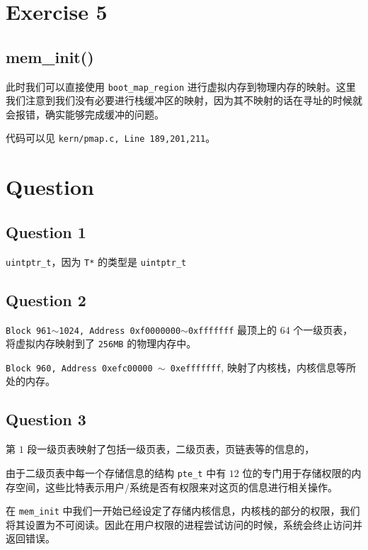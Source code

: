 \documentclass[11pt]{article}
\begin{document}
	
	\section{Exercise 5}
	
	\subsection*{mem\_init()}
		\par 此时我们可以直接使用 \texttt{boot\_map\_region} 进行虚拟内存到物理内存的映射。这里我们注意到我们没有必要进行栈缓冲区的映射，因为其不映射的话在寻址的时候就会报错，确实能够完成缓冲的问题。
	
		\par 代码可以见 \texttt{kern/pmap.c, Line 189,201,211}。
		
	\section{Question}
	
	\subsection*{Question 1}
		\par \texttt{uintptr\_t}，因为 \texttt{T*} 的类型是 \texttt{uintptr\_t}
		
	\subsection*{Question 2}
	\par 
	\texttt{Block 961$\sim$1024, Address 0xf0000000$\sim$0xfffffff} 最顶上的 $64$ 个一级页表，将虚拟内存映射到了 \texttt{256MB} 的物理内存中。
	\par 
	\texttt{Block 960, Address 0xefc00000 $\sim$ 0xefffffff}, 映射了内核栈，内核信息等所处的内存。
		
	\subsection*{Question 3}
	\par 第 $1$ 段一级页表映射了包括一级页表，二级页表，页链表等的信息的，
	
	\par 由于二级页表中每一个存储信息的结构 \texttt{pte\_t} 中有 $12$ 位的专门用于存储权限的内存空间，这些比特表示用户/系统是否有权限来对这页的信息进行相关操作。
	
	\par 在 \texttt{mem\_init} 中我们一开始已经设定了存储内核信息，内核栈的部分的权限，我们将其设置为不可阅读。因此在用户权限的进程尝试访问的时候，系统会终止访问并返回错误。 
	
\end{document}

